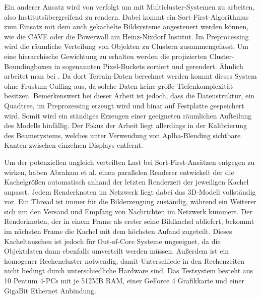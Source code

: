 Ein anderer Ansatz wird von \cite{dpbp} verfolgt um mit Multicluster-Systemen zu arbeiten, also Institutsübergreifend zu rendern. Dabei kommt ein Sort-First-Algorithmus zum Einsatz mit dem auch gekachelte Bildsysteme angesteuert werden können, wie die CAVE \cite{cave} oder die Powerwall am Heinz-Nixdorf Institut. Im Preprocessing wird die räumliche Verteilung von Objekten zu Clustern zusammengefasst. Um eine hierarchische Gewichtung zu erhalten werden die projizierten Cluster-Boundingboxen in sogenannten Pixel-Buckets sortiert und gerendert.\linebreak
Ähnlich arbeitet man bei \cite{DBLP:journals/ijvr/YinJSZ06}. Da dort Terrain-Daten berechnet werden kommt dieses System ohne Frustum-Culling aus, da solche Daten keine große Tiefenkomplexität besitzen. Bemerkenswert bei dieser Arbeit ist jedoch, dass die Datenstruktur, ein Quadtree, im Preprozessing erzeugt wird und binar auf Festplatte gespeichert wird. Somit wird ein ständiges Erzeugen einer geeigneten räumlichen Aufteilung des Modells hinfällig. Der Fokus der Arbeit liegt allerdings in der Kalibrierung des Beamerystems, welches unter Verwendung von Aplha-Blending sichtbare Kanten zwischen einzelnen Displays entfernt.

Um der potenziellen ungleich verteilten Last bei Sort-First-Ansätzen entgegen zu wirken, haben Abraham et al. \cite{abraham} einen parallelen Renderer entwickelt der die Kachelgrößen automatisch anhand der letzten Renderzeit der jeweiligen Kachel anpasst. Jedem Renderknoten im Netzwerk liegt dabei das 3D-Modell vollständig vor. Ein Thread ist immer für die Bilderzeugung zuständig, während ein Weiterer sich um den Versand und Empfang von Nachrichten im Netzwerk kümmert. Der Renderknoten, der in einem Frame als erster seine Bildkachel abliefert, bekommt im nächsten Frame die Kachel mit dem höchsten Aufand zugeteilt. Dieses Kacheltauschen ist jedoch für Out-of-Core Systeme ungeeignet, da die Objektdaten dann ebenfalls umverteilt werden müssen. Außerdem ist ein homogener Rechencluster notwendig, damit Unterschiede in den Rechenzeiten nicht bedingt durch unterschiedliche Hardware sind. Das Testsystem besteht aus 10 Pentum 4-PCs mit je 512MB RAM, einer GeForce 4 Grafikkarte und einer GigaBit Ethernet Anbindung.\linebreak

